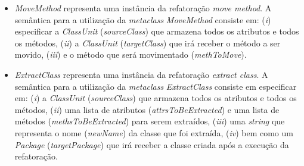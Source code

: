 \begin{itemize}
\item \textit{MoveMethod} representa uma instância da refatoração \textit{move method}. A semântica para a utilização da \textit{metaclass} \textit{MoveMethod} consiste em: (\textit{i}) especificar a \textit{ClassUnit} (\textit{sourceClass}) que armazena todos os atributos e todos os métodos, (\textit{ii}) a \textit{ClassUnit} (\textit{targetClass}) que irá receber o método a ser movido, (\textit{iii}) e o método que será movimentado (\textit{methToMove}).

\item \textit{ExtractClass} representa uma instância da refatoração \textit{extract class}. A semântica para a utilização da \textit{metaclass} \textit{ExtractClass} consiste em especificar em: (\textit{i}) a \textit{ClassUnit} (\textit{sourceClass}) que armazena todos os atributos e todos os métodos, (\textit{ii}) uma lista de atributos (\textit{attrsToBeExtracted}) e uma lista de métodos (\textit{methsToBeExtracted}) para serem extraídos, (\textit{iii}) uma \textit{string} que representa o nome (\textit{newName}) da classe que foi extraída, (\textit{iv}) bem como um \textit{Package} (\textit{targetPackage}) que irá receber a classe criada após a execução da refatoração.

\end{itemize} 



